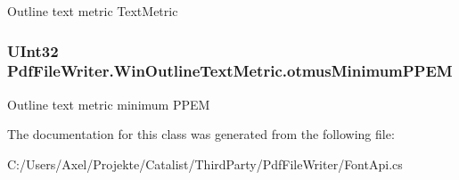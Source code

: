 Outline text metric Text\+Metric 

\subsubsection[{\texorpdfstring{otmus\+Minimum\+P\+P\+EM}{otmusMinimumPPEM}}]{\setlength{\rightskip}{0pt plus 5cm}U\+Int32 Pdf\+File\+Writer.\+Win\+Outline\+Text\+Metric.\+otmus\+Minimum\+P\+P\+EM\hspace{0.3cm}{\ttfamily [get]}}\hypertarget{class_pdf_file_writer_1_1_win_outline_text_metric_ae5ab34c524bb3efb5126364c3068d582}{}\label{class_pdf_file_writer_1_1_win_outline_text_metric_ae5ab34c524bb3efb5126364c3068d582}


Outline text metric minimum P\+P\+EM 



The documentation for this class was generated from the following file\+:\begin{DoxyCompactItemize}
\item 
C\+:/\+Users/\+Axel/\+Projekte/\+Catalist/\+Third\+Party/\+Pdf\+File\+Writer/Font\+Api.\+cs\end{DoxyCompactItemize}
